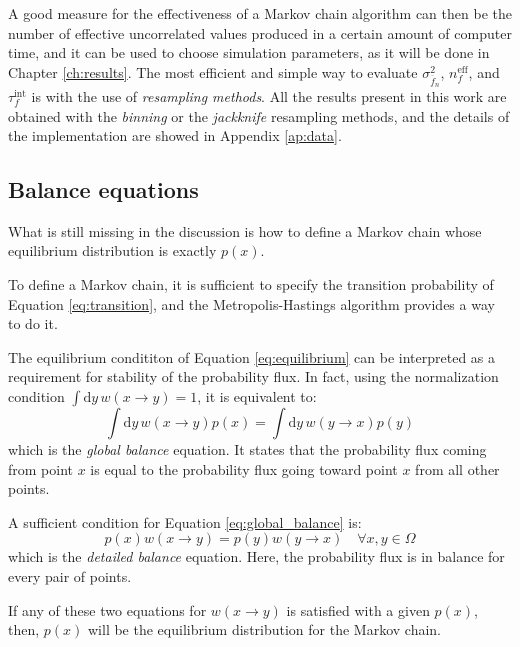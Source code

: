 A good measure for the effectiveness of a Markov chain algorithm can then be the number of effective uncorrelated values produced in a certain amount of computer time,
and it can be used to choose simulation parameters, as it will be done in Chapter \ref{ch:results}.
The most efficient and simple way to evaluate $\sigma_{\overline f_n}^2$, $n_f^\mathrm{eff}$, and $\tau_f^\mathrm{int}$ is with the use of \emph{resampling methods}.
All the results present in this work are obtained with the \emph{binning} or the \emph{jackknife} resampling methods,
and the details of the implementation are showed in Appendix \ref{ap:data}.

\subsection*{Balance equations}
What is still missing in the discussion is how to define a Markov chain whose equilibrium distribution is exactly $p(x)$.

To define a Markov chain, it is sufficient to specify the transition probability of Equation \eqref{eq:transition},
and the Metropolis-Hastings algorithm provides a way to do it.

The equilibrium condititon of Equation \eqref{eq:equilibrium}
can be interpreted as a requirement for stability of the probability flux.
In fact, using the normalization condition $\int\mathrm dy\,w(x \to y) = 1$,
it is equivalent to:
\begin{equation}\label{eq:global_balance}
	\int\mathrm dy\,w(x \to y)p(x) = \int\mathrm dy\,w(y \to x)p(y)
\end{equation}
which is the \emph{global balance} equation.
It states that the probability flux coming from point $x$
is equal to the probability flux going toward point $x$ from all other points.

A sufficient condition for Equation \eqref{eq:global_balance} is:
\begin{equation}\label{eq:detailed_balance}
	p(x)w(x \to y) = p(y)w(y \to x) \quad \forall x,y\in\Omega
\end{equation}
which is the \emph{detailed balance} equation.
Here, the probability flux is in balance for every pair of points.

If any of these two equations for $w(x \to y)$ is satisfied with a given $p(x)$,
then, $p(x)$ will be the equilibrium distribution for the Markov chain.

